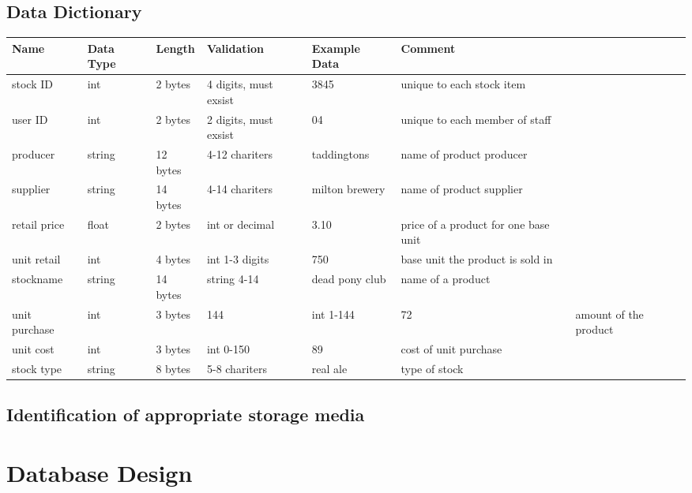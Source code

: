 \subsection{Data Dictionary}
\begin{center}
\begin{tabular}{|l|l|l|l|l|l|}
    \hline
    \textbf{Name} & \textbf{Data Type} & \textbf{Length} & \textbf{Validation} & \textbf{Example Data} & \textbf{Comment} \\ \hline
	stock ID & int & 2 bytes & 4 digits, must exsist & 3845 & unique to each stock item\\ \hline
	user ID & int & 2 bytes & 2 digits, must exsist & 04 & unique to each member of staff\\ \hline
	producer & string & 12 bytes & 4-12 chariters & taddingtons & name of product producer\\ \hline
	supplier & string & 14 bytes & 4-14 chariters & milton brewery & name of product supplier \\ \hline
	retail price & float & 2 bytes & int or decimal & 3.10 & price of a product for one base unit\\ \hline
	unit retail & int & 4 bytes & int 1-3 digits & 750 & base unit the product is sold in\\ \hline
	stockname & string & 14 bytes & string 4-14 & dead pony club & name of a product\\ \hline
	unit purchase & int & 3 bytes & 144 & int 1-144 & 72 & amount of the product\\ \hline
	unit cost & int & 3 bytes & int 0-150 & 89 & cost of unit purchase\\ \hline
	stock type & string & 8 bytes & 5-8 chariters & real ale & type of stock\\ \hline
	 
\end{tabular}
\label{tab:range_examples}
\end{center}

\subsection{Identification of appropriate storage media}

  


\section{Database Design}

